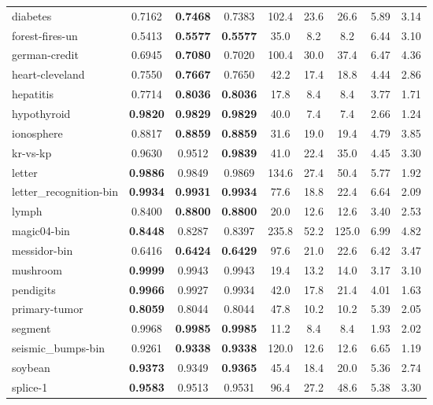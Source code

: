 \begin{table}[htbp]
\begin{tabular}{l|ccc|ccc|cc}
diabetes & 0.7162 & \textbf{0.7468} & 0.7383 & 102.4 & 23.6 & 26.6 & 5.89 & 3.14 \\
forest-fires-un & 0.5413 & \textbf{0.5577} & \textbf{0.5577} & 35.0 & 8.2 & 8.2 & 6.44 & 3.10 \\
german-credit & 0.6945 & \textbf{0.7080} & 0.7020 & 100.4 & 30.0 & 37.4 & 6.47 & 4.36 \\
heart-cleveland & 0.7550 & \textbf{0.7667} & 0.7650 & 42.2 & 17.4 & 18.8 & 4.44 & 2.86 \\
hepatitis & 0.7714 & \textbf{0.8036} & \textbf{0.8036} & 17.8 & 8.4 & 8.4 & 3.77 & 1.71 \\
hypothyroid & \textbf{0.9820} & \textbf{0.9829} & \textbf{0.9829} & 40.0 & 7.4 & 7.4 & 2.66 & 1.24 \\
ionosphere & 0.8817 & \textbf{0.8859} & \textbf{0.8859} & 31.6 & 19.0 & 19.4 & 4.79 & 3.85 \\
kr-vs-kp & 0.9630 & 0.9512 & \textbf{0.9839} & 41.0 & 22.4 & 35.0 & 4.45 & 3.30 \\
letter & \textbf{0.9886} & 0.9849 & 0.9869 & 134.6 & 27.4 & 50.4 & 5.77 & 1.92 \\
letter\_recognition-bin & \textbf{0.9934} & \textbf{0.9931} & \textbf{0.9934} & 77.6 & 18.8 & 22.4 & 6.64 & 2.09 \\
lymph & 0.8400 & \textbf{0.8800} & \textbf{0.8800} & 20.0 & 12.6 & 12.6 & 3.40 & 2.53 \\
magic04-bin & \textbf{0.8448} & 0.8287 & 0.8397 & 235.8 & 52.2 & 125.0 & 6.99 & 4.82 \\
messidor-bin & 0.6416 & \textbf{0.6424} & \textbf{0.6429} & 97.6 & 21.0 & 22.6 & 6.42 & 3.47 \\
mushroom & \textbf{0.9999} & 0.9943 & 0.9943 & 19.4 & 13.2 & 14.0 & 3.17 & 3.10 \\
pendigits & \textbf{0.9966} & 0.9927 & 0.9934 & 42.0 & 17.8 & 21.4 & 4.01 & 1.63 \\
primary-tumor & \textbf{0.8059} & 0.8044 & 0.8044 & 47.8 & 10.2 & 10.2 & 5.39 & 2.05 \\
segment & 0.9968 & \textbf{0.9985} & \textbf{0.9985} & 11.2 & 8.4 & 8.4 & 1.93 & 2.02 \\
seismic\_bumps-bin & 0.9261 & \textbf{0.9338} & \textbf{0.9338} & 120.0 & 12.6 & 12.6 & 6.65 & 1.19 \\
soybean & \textbf{0.9373} & 0.9349 & \textbf{0.9365} & 45.4 & 18.4 & 20.0 & 5.36 & 2.74 \\
splice-1 & \textbf{0.9583} & 0.9513 & 0.9531 & 96.4 & 27.2 & 48.6 & 5.38 & 3.30 \\

\end{tabular}
\end{table}
